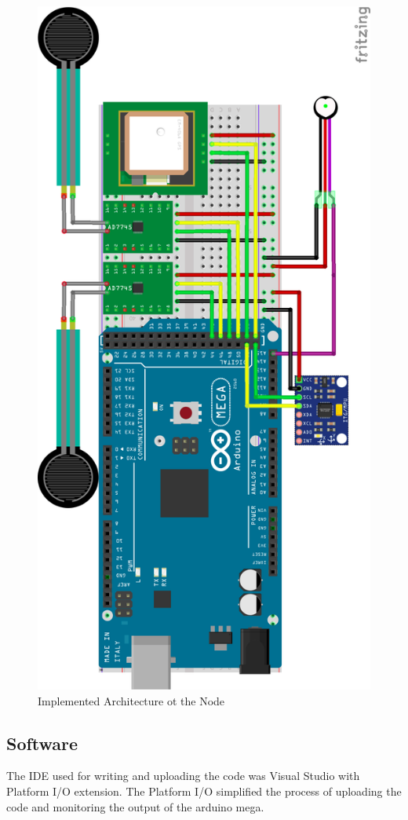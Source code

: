 		\begin{figure}[h]
			\centering
			\includegraphics[width=0.8\linewidth]{gfx/node_diagram}
			\caption[]{Implemented Architecture ot the Node}
			\label{fig:architecture_node}
		\end{figure}

	\subsection{Software}
		The IDE used for writing and uploading the code was Visual Studio with Platform I/O extension. The Platform I/O simplified the process of uploading the code and monitoring the output of the arduino mega.


